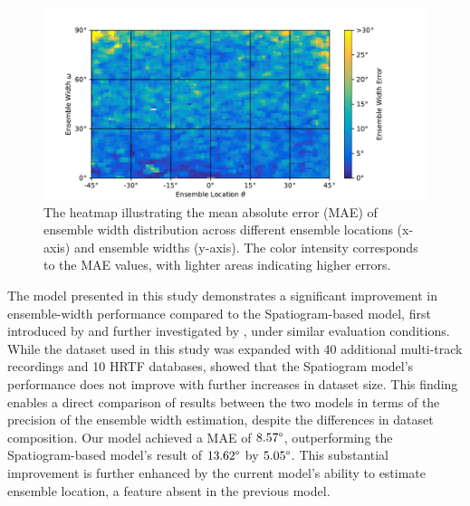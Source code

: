 \documentclass[11pt]{article}
\begin{document}
\begin{figure}[ht!]
  \centering
  \includegraphics[width=\linewidth]{../figures/map_mae_width.pdf}
  \caption{\label{fig:map_mae_width}The heatmap illustrating the mean absolute error (MAE) of ensemble width distribution across different ensemble locations (x-axis) and ensemble widths (y-axis). The color intensity corresponds to the MAE values, with lighter areas indicating higher errors.}
\end{figure}

The model presented in this study demonstrates a significant improvement in ensemble-width performance compared to the Spatiogram-based model, first introduced by \textcite{arthi_spatiogram_2021} and further investigated by \textcite{antoniuk_blind_2023}, under similar evaluation conditions. While the dataset used in this study was expanded with 40 additional multi-track recordings and 10 HRTF databases, \textcite{antoniuk_blind_2023} showed that the Spatiogram model's performance does not improve with further increases in dataset size. This finding enables a direct comparison of results between the two models in terms of the precision of the ensemble width estimation, despite the differences in dataset composition. Our model achieved a MAE of $8.57\degree$, outperforming the Spatiogram-based model's result of $13.62\degree$ by $5.05\degree$. This substantial improvement is further enhanced by the current model's ability to estimate ensemble location, a feature absent in the previous model.
\end{document}
